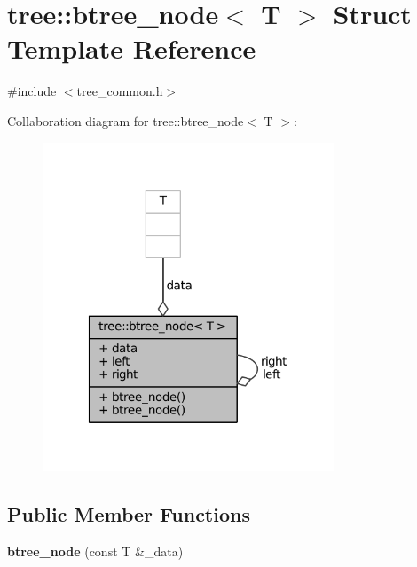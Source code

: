 \hypertarget{structtree_1_1btree__node}{\section{tree\-:\-:btree\-\_\-node$<$ \-T $>$ \-Struct \-Template \-Reference}
\label{structtree_1_1btree__node}
}


{\ttfamily \#include $<$tree\-\_\-common.\-h$>$}



\-Collaboration diagram for tree\-:\-:btree\-\_\-node$<$ \-T $>$\-:
\nopagebreak
\begin{figure}[H]
\begin{center}
\leavevmode
\includegraphics[width=247pt]{structtree_1_1btree__node__coll__graph}
\end{center}
\end{figure}
\subsection*{\-Public \-Member \-Functions}
\begin{DoxyCompactItemize}
\item 
\hypertarget{structtree_1_1btree__node_a6f97b71a8cb5cf273cf3a1635a1b8551}{{\bfseries btree\-\_\-node} (const \-T \&\-\_\-data)}\label{structtree_1_1btree__node_a6f97b71a8cb5cf273cf3a1635a1b8551}

\end{DoxyCompactItemize}
